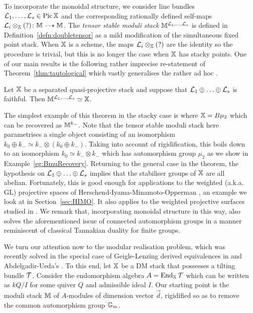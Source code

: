 \documentclass[12pt]{amsart}
\begin{document}
To incorporate the monoidal structure, we consider line bundles $\mathcal{L}_1,\ldots, \mathcal{L}_s \in \operatorname{Pic} \mathbb{X}$ and the corresponding rationally defined self-maps $\mathcal{L}_i \otimes_{\mathbb{X}} (?) \colon \mathbb{M} \dashrightarrow \mathbb{M}$. The {\em tensor stable moduli stack} $\mathbb{M}^{\mathcal{L}_1,\ldots,\mathcal{L}_s}$ is defined in Definition~\ref{defn:doubletensor} as a mild modification of the simultaneous fixed point stack. When $\mathbb{X}$ is a scheme, the maps $\mathcal{L}_i \otimes_{\mathbb{X}} (?)$ are the identity so the procedure is trivial, but this is no longer the case when $\mathbb{X}$ has stacky points. One of our main results is the following rather imprecise re-statement of Theorem~\ref{thm:tautological} which vastly generalises the rather ad hoc \cite[Theorem~9.6]{CL}.
\begin{theorem}
Let $\mathbb{X}$ be a separated quasi-projective stack and suppose that $\mathcal{L}_1\oplus \ldots \oplus \mathcal{L}_s$ is faithful. Then $\mathbb{M}^{\mathcal{L}_1,\ldots,\mathcal{L}_s} \simeq \mathbb{X}$.
\end{theorem}
\noindent 
The simplest example of this theorem in the stacky case is where $\mathbb{X} = B\mu_2$ which can be recovered as $\mathbb{M}^{k_-}$.  Note that the tensor stable moduli stack here parametrises a single object consisting of an isomorphism $k_0 \oplus k_- \simeq k_- \otimes (k_0 \oplus k_-)$. Taking into account of rigidification, this boils down to an isomorphism $k_0 \simeq k_- \otimes k_-$ which has automorphism group $\mu_2$ as we show in Example~\ref{eg:BmuRecovery}. 
Returning to the general case in the theorem, the hypothesis on $\mathcal{L}_1\oplus \ldots \oplus\mathcal{L}_s$ implies that the stabiliser groups of $\mathbb{X}$ are all abelian. Fortunately, this is good enough for applications to the weighted (a.k.a. GL) projective spaces of Herschend-Iyama-Minamoto-Opperman \cite{HIMO}, an example we look at in Section~\ref{sec:HIMO}. It also applies to the weighted projective surfaces studied in \cite{C17}. We remark that, incorporating monoidal structure in this way, also solves the aforementioned issue of connected automorphism groups in a manner reminiscent of classical Tannakian duality for finite groups.

We turn our attention now to the modular realisation problem, which was recently solved in the special case of Geigle-Lenzing \cite{GL} derived equivalences in \cite{CL} and Abdelgadir-Ueda's \cite{AU}. To this end, let $\mathbb{X}$ be a DM stack that possesses a tilting bundle $\mathcal{T}$. Consider the endomorphism algebra $A = \operatorname{End}_{\mathbb{X}} \mathcal{T}$ which can be written as $kQ/I$ for some quiver $Q$ and admissible ideal $I$. Our starting point is the moduli stack $\mathbb{M}$ of $A$-modules of dimension vector $\vec{d}$, rigidified so as to remove the common automorphism group $\mathbb{G}_m$. 
\end{document}

